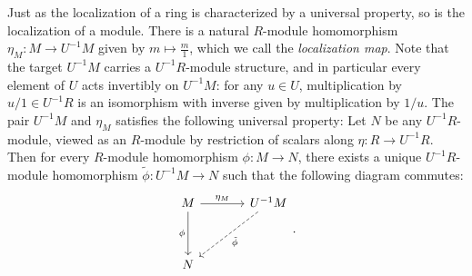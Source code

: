 \documentclass[12pt,reqno]{amsart}
\begin{document}
Just as the localization of a ring is characterized by a universal property, so is the localization of a module. There is a natural $R$-module homomorphism $\eta_{M}: M\to U^{-1}M$ given by $m\mapsto \frac{m}{1}$, which we call the \emph{localization map}. Note that the target $U^{-1}M$ carries a $U^{-1}R$-module structure, and in particular every element of $U$ acts invertibly on $U^{-1}M$: for any $u\in U$, multiplication by $u/1\in U^{-1}R$ is an isomorphism with inverse given by multiplication by $1/u$. The pair $U^{-1}M$ and $\eta_{M}$ satisfies the following universal property: Let $N$ be any $U^{-1}R$-module, viewed as an $R$-module by restriction of scalars along $\eta: R\to U^{-1}R$. Then for every $R$-module homomorphism $\phi: M\to N$, there exists a unique $U^{-1}R$-module homomorphism $\tilde{\phi}: U^{-1}M\to N$ such that the following diagram commutes:
\[
\begin{tikzcd}[row sep = 3.5em, column sep = 3.5em]
M \arrow[r, "\eta_{M}"] \arrow[d, "\phi"'] & U^{-1}M \arrow[dl, dashed, "\tilde{\phi}"] \\
N &
\end{tikzcd}.
\]

\hrulefill
\end{document}
